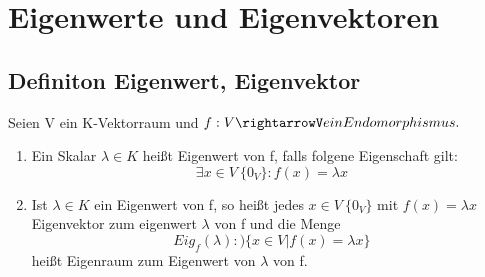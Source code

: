 
\section{Eigenwerte und Eigenvektoren}

\subsection{Definiton Eigenwert, Eigenvektor}
Seien V ein K-Vektorraum und $f:V\rightarrowV ein Endomorphismus.$
\begin{enumerate}[label=(\alph*)]
    \item Ein Skalar $\lambda \in K$ heißt Eigenwert von f, falls folgene Eigenschaft gilt: \[\exists x \in V \  \{ 0_V\} : f(x)=\lambda x \]
    \item Ist $\lambda \in K$ ein Eigenwert von f, so heißt jedes $x \in V \ \{0_V\}$ mit $f(x) = \lambda x$
    Eigenvektor zum eigenwert $\lambda $ von f und die Menge
    \[Eig_f(\lambda) :) \{x\in V | f(x) = \lambda x\}\] heißt Eigenraum zum Eigenwert von $\lambda$ von f.
\end{enumerate}
